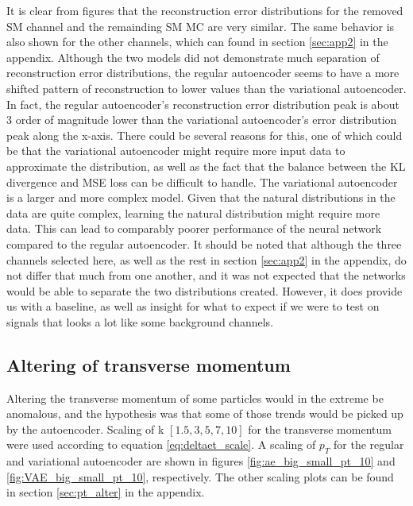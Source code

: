 It is clear from figures that the reconstruction error distributions for the removed SM channel and the remainding SM MC are very similar. 
The same behavior is also shown for the other channels, which can found in section \ref{sec:app2} in the appendix. Although the two models did not demonstrate much separation
of reconstruction error distributions, the regular autoencoder seems to have a more shifted pattern of reconstruction to lower 
values than the variational autoencoder. In fact, the regular autoencoder's reconstruction error distribution peak is about 3 order of 
magnitude lower than the variational autoencoder's error distribution peak along the x-axis. There could be several reasons for this, one of which could be that 
the variational autoencoder might require more input data to approximate the distribution, as well as the fact that the balance between the KL divergence and MSE loss 
can be difficult to handle\cite{kl_mse_balance}. The variational autoencoder is a larger and more complex model. Given that the natural distributions in the data are quite complex, 
learning the natural distribution might require more data. This can lead to comparably poorer performance of the neural network compared to the regular autoencoder. 
It should be noted that although the three channels selected here, as well as the rest in section \ref{sec:app2} in the appendix, do not differ that much from one another, and it was not expected that the networks 
would be able to separate the two distributions created. However, it does provide us with a baseline, as well as insight for what 
to expect if we were to test on signals that looks a lot like some background channels. 


\subsection*{Altering of transverse momentum}
Altering the transverse momentum of some particles would in the extreme be anomalous, and the hypothesis was that some of those trends would be
picked up by the autoencoder. Scaling of k \in $[1.5, 3, 5, 7, 10]$ for the transverse momentum were used according to equation \ref{eq:deltaet_scale}. 
A scaling of $p_T$ for the regular and variational autoencoder are shown in figures \ref{fig:ae_big_small_pt_10}
 and \ref{fig:VAE_big_small_pt_10}, respectively. The other scaling plots can be found in section \ref{sec:pt_alter} in the appendix.





